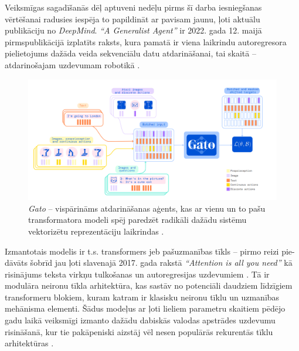 \documentclass[12pt, a4paper]{article}
\numberwithin{equation}{section} %
\begin{document}
Veiksmīgas sagadīšanās dēļ aptuveni nedēļu pirms šī darba iesniegšanas vērtēšanai radusies iespēja to papildināt ar pavisam jaunu, ļoti aktuālu publikāciju no \textit{DeepMind}. \textit{``A Generalist Agent''} ir 2022. gada 12. maijā pirmspublikācijā izplatīts raksts, kura pamatā ir viena laikrindu autoregresora pielietojums dažāda veida sekvenciālu datu atdarināšanai, tai skaitā -- atdarinošajam uzdevumam robotikā \cite{reed2022generalist}.

\begin{figure}[t!]
    \centering
    \includegraphics[width=16cm,page=1]{../img/gato.png}
    \caption{\textit{Gato} -- vispārināms atdarināšanas aģents, kas ar vienu un to pašu transformatora modeli spēj paredzēt radikāli dažādu sistēmu vektorizētu reprezentāciju laikrindas \cite{reed2022generalist}.}
\end{figure}

Izmantotais modelis ir t.s. transformers jeb pašuzmanības tīkls -- pirmo reizi pie-dāvāts šobrīd jau ļoti slavenajā 2017. gada rakstā \textit{``Attention is all you need''} kā risinājums teksta virkņu tulkošanas un autoregresijas uzdevumiem \cite{vaswani2017attention}. Tā ir modulāra neironu tīkla arhitektūra, kas sastāv no potenciāli daudziem līdzīgiem transformeru blokiem, kuram katram ir klasisku neironu tīklu un uzmanības mehānisma elementi. Šādus modeļus ar ļoti lieliem parametru skaitiem pēdējo gadu laikā veiksmīgi izmanto dažādu dabiskās valodas apstrādes uzdevumu risināšanā, kur tie pakāpeniski aizstāj vēl nesen populārās rekurentās tīklu arhitektūras \cite{radford2018improving}.
\end{document}
